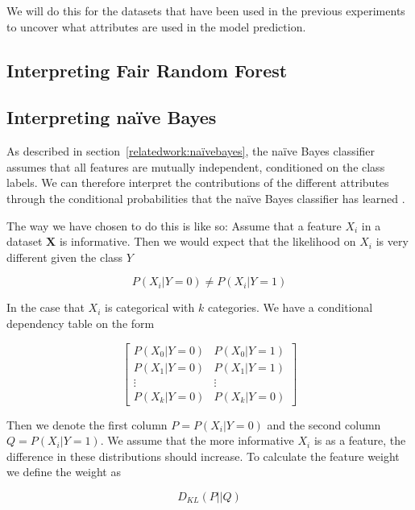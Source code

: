 We will do this for the datasets that have been used in the previous experiments to uncover what attributes are used in the model prediction.

\subsection{Interpreting Fair Random Forest}



\subsection{Interpreting naïve Bayes}

As described in section~\ref{relatedwork:naïvebayes}, the naïve Bayes classifier assumes that all features are mutually independent, conditioned on the class labels. We can therefore interpret the contributions of the different attributes through the conditional probabilities that the naïve Bayes classifier has learned \cite[p.~142]{Molnar:2020:Book}.

The way we have chosen to do this is like so: Assume that a feature $X_i$ in a dataset $\boldsymbol{X}$ is informative. Then we would expect that the likelihood on $X_i$ is very different given the class $Y$

\begin{equation*}
    P(X_i | Y = 0) \neq P(X_i | Y = 1)
\end{equation*}

In the case that $X_i$ is categorical with $k$ categories. We have a conditional dependency table on the form

\begin{equation*}
    \begin{bmatrix}
        P(X_0 | Y = 0) & P(X_0 | Y = 1) \\ 
        P(X_1 | Y = 0) & P(X_1 | Y = 1) \\
        \vdots & \vdots \\
        P(X_k | Y = 0) & P(X_k | Y = 0)
    \end{bmatrix}
\end{equation*}

Then we denote the first column $P = P(X_i | Y = 0)$ and the second column $Q = P(X_i | Y = 1)$. We assume that the more informative $X_i$ is as a feature, the difference in these distributions should increase. To calculate the feature weight we define the weight as 

\begin{equation*}
    D_{KL}(P||Q)
\end{equation*}

